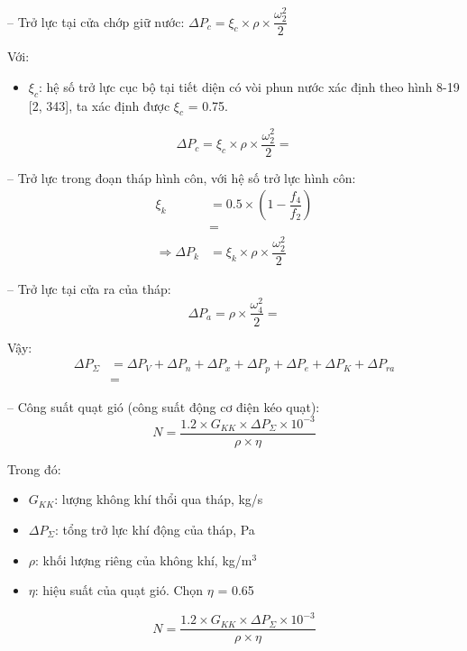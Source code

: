 -- Trở lực tại cửa chớp giữ nước: $\Delta P_{c} = \xi_{c}\times\rho\times\dfrac{\omega_{2}^2}{2}$

Với:
\begin{itemize}
	\item $\xi_{c}$: hệ số trở lực cục bộ tại tiết diện có vòi phun nước xác định theo hình 8-19 [2, 343], ta xác định được $\xi_{c}$ = 0.75.
\end{itemize}
\begin{equation*}
	\Delta P_{c} = \xi_{c}\times\rho\times\dfrac{\omega_{2}^2}{2} = 
\end{equation*}

-- Trở lực trong đoạn tháp hình côn, với hệ số trở lực hình côn:
\begin{equation*}
	\begin{split}
		\xi_{k} &= 0.5\times\left(1-\dfrac{f_{4}}{f_{2}}\right)\\
		&= \\
		\Rightarrow \Delta P_{k} &= \xi_{k}\times\rho\times\dfrac{\omega_{2}^2}{2}
	\end{split}
\end{equation*}

-- Trở lực tại cửa ra của tháp:
\begin{equation*}
	\Delta P_{a} = \rho\times\dfrac{\omega_{4}^{2}}{2} = 
\end{equation*}

Vậy:
\begin{equation*}
	\begin{split}
		\Delta P_{\Sigma} &= \Delta P_{V} + \Delta P_{n} + \Delta P_{x} + \Delta P_{p} + \Delta P_{e} + \Delta P_{K} + \Delta P_{ra}\\
		&=
	\end{split}
\end{equation*}

-- Công suất quạt gió (công suất động cơ điện kéo quạt):
\begin{equation*}
	N = \dfrac{1.2\times G_{KK}\times\Delta P_{\Sigma}\times 10^{-3}}{\rho\times\eta}
\end{equation*}

Trong đó:
\begin{itemize}
	\item $G_{KK}$: lượng không khí thổi qua tháp, kg/s
	\item $\Delta P_{\Sigma}$: tổng trở lực khí động của tháp, Pa
	\item $\rho$: khối lượng riêng của không khí, kg/m$^3$
	\item $\eta$: hiệu suất của quạt gió. Chọn $\eta$ = 0.65
\end{itemize}
\begin{equation*}
	N = \dfrac{1.2\times G_{KK}\times\Delta P_{\Sigma}\times 10^{-3}}{\rho\times\eta}
\end{equation*}

